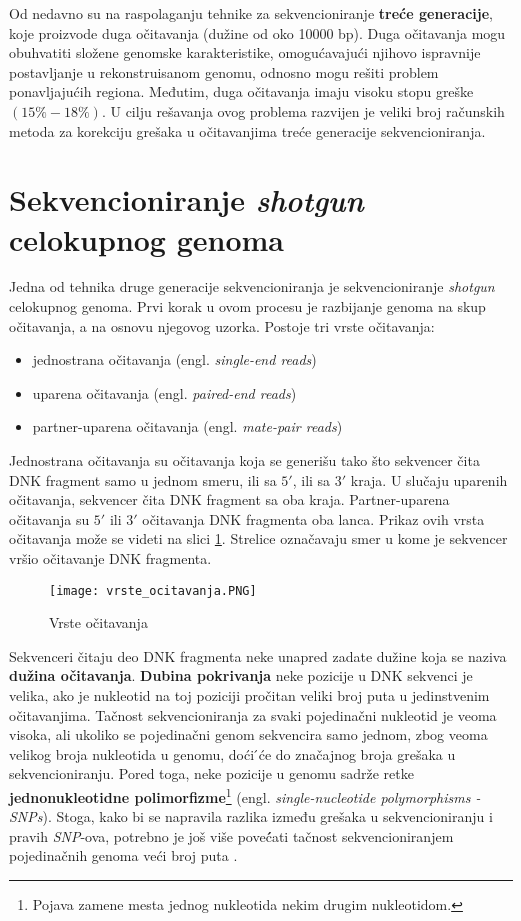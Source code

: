 \documentclass[12pt,oneside]{memoir}
\begin{document}
Od nedavno su na raspolaganju tehnike za sekvencioniranje \textbf{treće generacije}, koje proizvode duga očitavanja (dužine od oko 10000 bp). Duga očitavanja mogu obuhvatiti složene genomske karakteristike, omogućavajući njihovo ispravnije postavljanje u rekonstruisanom genomu, odnosno mogu rešiti problem ponavljajućih regiona. Međutim, duga očitavanja imaju visoku stopu greške $(15\%-18\%)$. U cilju rešavanja ovog problema razvijen je veliki broj računskih metoda za korekciju grešaka u očitavanjima treće generacije sekvencioniranja.

\section{Sekvencioniranje \textit{shotgun} celokupnog genoma}

Jedna od tehnika druge generacije sekvencioniranja je  sekvencioniranje \textit{shotgun} celokupnog genoma. Prvi korak u ovom procesu je razbijanje genoma na skup očitavanja, a na osnovu njegovog uzorka. Postoje tri vrste očitavanja:

\begin{itemize}
\itemsep0em 
    \item {jednostrana očitavanja (engl. \textit{single-end reads})}
    \item {uparena očitavanja (engl. \textit{paired-end reads})}
    \item{partner-uparena očitavanja} (engl. \textit{mate-pair reads})
\end{itemize}

Jednostrana očitavanja su očitavanja koja se generišu tako što sekvencer čita DNK fragment samo u jednom smeru, ili sa $5'$, ili sa $3'$ kraja. U slučaju uparenih očitavanja, sekvencer čita DNK fragment sa oba kraja. Partner-uparena očitavanja su $5'$ ili $3'$ očitavanja DNK fragmenta oba lanca. Prikaz ovih vrsta očitavanja može se videti na slici \ref{fig:01}. Strelice označavaju smer u kome je sekvencer vršio očitavanje DNK fragmenta.

\begin{figure}[!ht]
  \centering
  \texttt{[image: vrste\_ocitavanja.PNG]}
  \caption{Vrste očitavanja \cite{wholeGenomeSeq}}
  \label{fig:01}
\end{figure}

Sekvenceri čitaju deo DNK fragmenta neke unapred
zadate dužine koja se naziva \textbf{dužina očitavanja}. \textbf{Dubina pokrivanja} neke pozicije u DNK sekvenci je velika, ako je nukleotid na toj poziciji pročitan veliki broj puta u jedinstvenim očitavanjima. Tačnost sekvencioniranja za svaki pojedinačni nukleotid je veoma visoka, ali ukoliko se pojedinačni genom sekvencira samo jednom, zbog veoma velikog broja nukleotida u genomu, doći ́će do značajnog broja grešaka u sekvencioniranju. Pored toga, neke pozicije u genomu sadrže retke \textbf{jednonukleotidne polimorfizme}\footnote{Pojava zamene mesta jednog nukleotida nekim drugim nukleotidom.} (engl. \textit{single-nucleotide polymorphisms - SNPs}). Stoga, kako bi se napravila razlika između grešaka u sekvencioniranju i pravih \textit{SNP}-ova, potrebno je još više poveć́ati tačnost sekvencioniranjem pojedinačnih genoma veći broj puta \cite{SequencingCoverage}.
\end{document}
